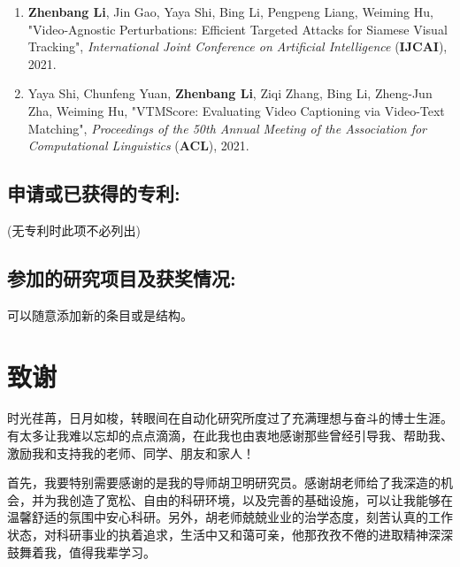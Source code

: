 {
\setlist[enumerate]{}%
\begin{enumerate}[nosep]
    \item \textbf{Zhenbang Li}, Jin Gao, Yaya Shi, Bing Li, Pengpeng Liang, Weiming Hu, "Video-Agnostic Perturbations: Efficient Targeted Attacks for Siamese Visual Tracking", \textit{International Joint Conference on Artificial Intelligence} (\textbf{IJCAI}), 2021.
    \item Yaya Shi, Chunfeng Yuan, \textbf{Zhenbang Li}, Ziqi Zhang, Bing Li, Zheng-Jun Zha, Weiming Hu, "VTMScore: Evaluating Video Captioning via Video-Text Matching", \textit{Proceedings of the 50th Annual Meeting of the Association for Computational Linguistics} (\textbf{ACL}), 2021.
\end{enumerate}
}

\section*{申请或已获得的专利:}

(无专利时此项不必列出)

\section*{参加的研究项目及获奖情况:}

可以随意添加新的条目或是结构。

\chapter[致谢]{致\quad 谢}%
\thispagestyle{noheaderstyle}%

时光荏苒，日月如梭，转眼间在自动化研究所度过了充满理想与奋斗的博士生涯。有太多让我难以忘却的点点滴滴，在此我也由衷地感谢那些曾经引导我、帮助我、激励我和支持我的老师、同学、朋友和家人！

首先，我要特别需要感谢的是我的导师胡卫明研究员。感谢胡老师给了我深造的机会，并为我创造了宽松、自由的科研环境，以及完善的基础设施，可以让我能够在温馨舒适的氛围中安心科研。另外，胡老师兢兢业业的治学态度，刻苦认真的工作状态，对科研事业的执着追求，生活中又和蔼可亲，他那孜孜不倦的进取精神深深鼓舞着我，值得我辈学习。

